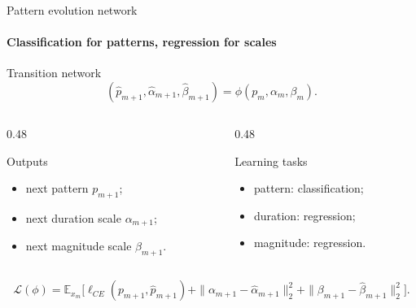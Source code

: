 \begin{frame}{Pattern evolution network}
\framesubtitle{Classification for patterns, regression for scales}
\begin{block}{Transition network}
\[ (\hat{p}_{m+1},\hat{\alpha}_{m+1},\hat{\beta}_{m+1}) = \phi(p_m,\alpha_m,\beta_m). \]
\end{block}

\begin{columns}[onlytextwidth]
\begin{column}{0.48\textwidth}
\begin{alertblock}{Outputs}
\begin{itemize}
  \item next pattern $p_{m+1}$;
  \item next duration scale $\alpha_{m+1}$;
  \item next magnitude scale $\beta_{m+1}$.
\end{itemize}
\end{alertblock}
\end{column}
\begin{column}{0.48\textwidth}
\begin{alertblock}{Learning tasks}
\begin{itemize}
  \item pattern: classification;
  \item duration: regression;
  \item magnitude: regression.
\end{itemize}
\end{alertblock}
\end{column}
\end{columns}

\medskip
\[ \mathcal{L}(\phi)
=
\mathbb{E}_{x_m}\!\bigl[
\ell_{CE}(p_{m+1},\hat{p}_{m+1})
+\|\alpha_{m+1}-\hat{\alpha}_{m+1}\|_2^2
+\|\beta_{m+1}-\hat{\beta}_{m+1}\|_2^2\bigr]. \]
\end{frame}


